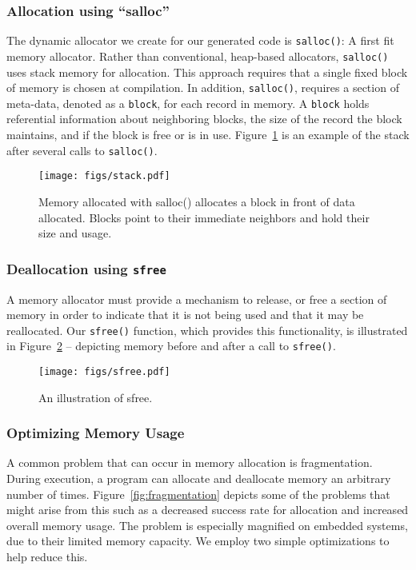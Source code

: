 \subsubsection{Allocation using ``salloc''}

The dynamic allocator we create for our generated code is \texttt{salloc()}: A first fit memory allocator. Rather than conventional, heap-based allocators, \texttt{salloc()} uses stack memory for allocation. This approach requires that a single fixed block of memory is chosen at compilation. In addition, \texttt{salloc()}, requires a section of meta-data, denoted as a \texttt{block}, for each record in memory. A \texttt{block} holds referential information about neighboring blocks, the size of the record the block maintains, and if the block is free or is in use. Figure~\ref{fig:stack} is an example of the stack after several calls to \texttt{salloc()}.

\begin{figure}[!htb]
\texttt{[image: figs/stack.pdf]}
\caption{Memory allocated with salloc() allocates a block in front of data allocated. Blocks point to their immediate neighbors and hold their size and usage.}

\label{fig:stack}
\end{figure}

\subsubsection{Deallocation using \texttt{sfree}}

A memory allocator must provide a mechanism to release, or free a section of memory in order to indicate that it is not being used and that it may be reallocated. Our \texttt{sfree()} function, which provides this functionality, is illustrated in Figure~\ref{fig:free} -- depicting memory before and after a call to \texttt{sfree()}. 

\begin{figure}[!htb]
\texttt{[image: figs/sfree.pdf]}
\caption{An illustration of sfree.}
\label{fig:free}
\end{figure}

\subsubsection{Optimizing Memory Usage}

A common problem that can occur in memory allocation is fragmentation. During execution, a program can allocate and deallocate memory an arbitrary number of times. Figure~\ref{fig:fragmentation} depicts some of the problems that might arise from this such as a decreased success rate for allocation and increased overall memory usage. The problem is especially magnified on embedded systems, due to their limited memory capacity. We employ two simple optimizations to help reduce this.

